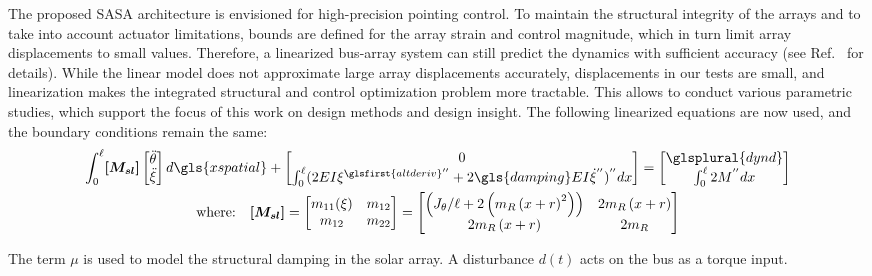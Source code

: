 The proposed SASA architecture is envisioned for high-precision pointing control. To maintain the structural integrity of the arrays and to take into account actuator limitations, bounds are defined for the array strain and control magnitude, which in turn limit array displacements to small values. Therefore, a linearized bus-array system can still predict the dynamics with sufficient accuracy (see Ref.~\cite{Chilan2017a} for details).
While the linear model does not approximate large array displacements accurately, displacements in our tests are small, and linearization  makes the integrated structural and control optimization problem more tractable. This allows to conduct various parametric studies, which support the focus of this work on design methods and design insight. The following linearized equations are now used, and the boundary conditions remain the same:
\begin{gather}
\begin{aligned}
\int_{0}^{\ell} \bm{[M_{sl}]} \begin{bmatrix} \ddot{\theta} \\ \ddot{\xi} \end{bmatrix}d\gls{xspatial} +  \begin{bmatrix} 0 \\ \int_{0}^{\ell} (2EI \xi^{\glsfirst{altderiv}''} +2 \gls{damping} EI \dot{\xi}^{''})^{''} dx\end{bmatrix} = \begin{bmatrix} \glsplural{dynd} \\ \int_{0}^{\ell} 2 M^{''} dx \end{bmatrix}
\end{aligned}\label{eq:ch7:PDEdynamics_linear}\\
\begin{gathered}
\text{where:} \quad \bm{[M_{sl}]} = \begin{bmatrix}m_{11}(\xi) & m_{12}\\ m_{12} & m_{22} \end{bmatrix}=\begin{bmatrix} \left(J_{\theta}/\ell + 2\left (m_{R}\left(x+r\right)^2 \right)  \right) & 2m_{R}\left(x+r \right) \\ 2m_{R}\left(x+r \right) & 2m_{R} \end{bmatrix} \\
\end{gathered} \notag
\end{gather}

\noindent The term $\mu$ is used to model the structural damping in the solar array. A disturbance $d(t)$ acts on the bus as a torque input. 


